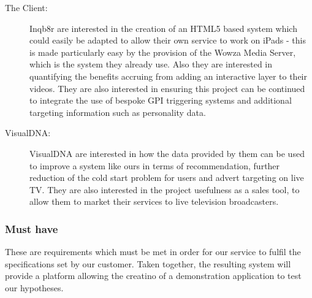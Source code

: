 \begin{description}
\item[The Client:]{Inqb8r are interested in the creation of an HTML5 based system which could easily be adapted to allow their own service to work on iPads - this is made particularly easy by the provision of the Wowza Media Server, which is the system they already use. Also they are interested in quantifying the benefits accruing from adding an interactive layer to their videos. They are also interested in ensuring this project can be continued to integrate the use of bespoke GPI triggering systems and additional targeting information such as personality data.}
\item[VisualDNA:]{VisualDNA are interested in how the data provided by them can be used to improve a system like ours in terms of recommendation, further reduction of the cold start problem for users and advert targeting on live TV. They are also interested in the project usefulness as a sales tool, to allow them to market their services to live television broadcasters.}
\end{description}

\subsubsection{Must have}
	These are requirements which must be met in order for our service to fulfil the specifications set by our customer. Taken together, the resulting system will provide a platform allowing the creatino of a demonstration application to test our hypotheses.
